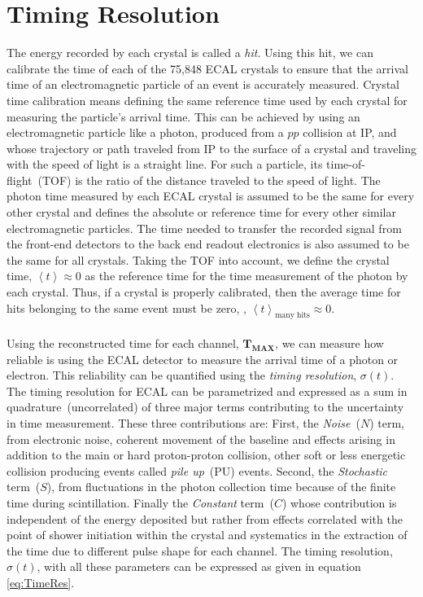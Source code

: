\section{Timing Resolution}
The energy recorded by each crystal is called a \textit{hit}.  Using this hit, we can calibrate the time of each of the  75,848 ECAL crystals to ensure that the arrival time of an electromagnetic particle of an event is accurately measured.
Crystal time calibration means defining the same reference time used by each crystal for measuring
the particle's arrival time. This can be achieved by using an electromagnetic particle like a photon, produced from a $pp$ collision
at IP, and whose trajectory or path traveled from IP to the surface of a crystal and traveling with the speed of light 
is a straight line. For such a particle, its time-of-flight~(TOF) is the ratio of the distance traveled to the speed of light.
The photon time measured by each ECAL crystal is assumed to be the same for every other crystal and defines the absolute or reference time for every other similar electromagnetic particles. The time needed to transfer the recorded signal from the front-end detectors to the back end readout electronics is also assumed to be the same for all crystals. Taking the TOF into account, we define the crystal time, $\left\langle t \right\rangle \approx 0$ as the reference time for the time measurement of the photon by each crystal.
Thus, if a crystal is properly calibrated, then the average time for hits belonging to the same event
must be zero, \ie, $\left\langle t \right\rangle_{\mbox{many hits}} \approx 0$. 
\paragraph*{}
Using the reconstructed time for each channel, $\mathbf{T_{MAX}}$, we  can measure how reliable is using the ECAL detector
to measure the arrival time of a photon or electron. This reliability can be quantified using the \textit{timing resolution}, $\sigma(t)$. The timing resolution for ECAL can be parametrized and expressed as a sum in quadrature~(uncorrelated) of three major terms contributing to the uncertainty in time measurement. These three contributions are: First, the \textit{Noise}~($N$) term, from electronic noise, coherent movement of the baseline and effects arising in addition to the main or hard proton-proton collision, other soft or less energetic collision producing events called \textit{pile up}~(PU) events. Second, the \textit{Stochastic} term~($S$), from fluctuations in the photon collection time because of the finite time during \pb scintillation. Finally the \textit{Constant} term~($C$) whose contribution is independent of the energy deposited but rather from effects correlated with the point of shower initiation within the crystal and systematics in the extraction of the time due to different pulse shape for each channel.
The timing resolution, $\sigma(t)$, with all these parameters can be expressed as given in equation \ref{eq:TimeRes}.

